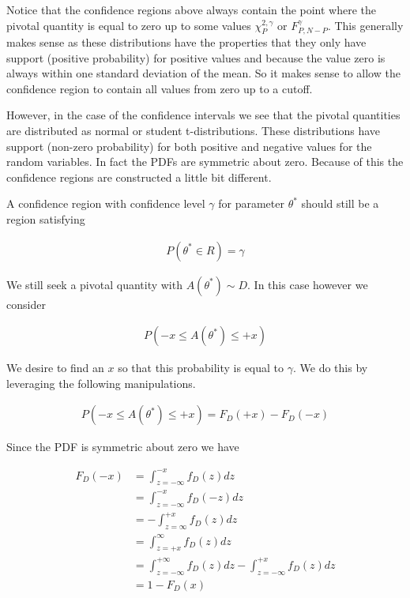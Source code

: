 \documentclass[12pt]{article}
\begin{document}
Notice that the confidence regions above always contain the point where the pivotal quantity is equal to zero up to some values $\chi^{2,\gamma}_P$ or $F_{P,N-P}^{\gamma}$.
This generally makes sense as these distributions have the properties that they only have support (positive probability) for positive values and because the value zero is always within one standard deviation of the mean.
So it makes sense to allow the confidence region to contain all values from zero up to a cutoff.

However, in the case of the confidence intervals we see that the pivotal quantities are distributed as normal or student t-distributions. 
These distributions have support (non-zero probability) for both positive and negative values for the random variables.
In fact the PDFs are symmetric about zero.
Because of this the confidence regions are constructed a little bit different.

A confidence region with confidence level $\gamma$ for parameter $\theta^*$ should still be a region satisfying

\begin{align}
P(\theta^* \in R) = \gamma
\end{align}

We still seek a pivotal quantity with $A(\theta^*) \sim D$.
In this case however we consider

\begin{align}
P(-x \le A(\theta^*) \le + x)
\end{align}

We desire to find an $x$ so that this probability is equal to $\gamma$.
We do this by leveraging the following manipulations.

\begin{align}
P(-x \le A(\theta^*) \le +x) = F_D(+x) - F_D(-x)
\end{align}

Since the PDF is symmetric about zero we have

\begin{align}
F_D(-x) &= \int_{z = -\infty}^{-x} f_D(z)dz\\
&= \int_{z=-\infty}^{-x}f_D(-z) dz\\
&= -\int_{z=\infty}^{+x}f_D(z)dz\\
&= \int_{z=+x}^{\infty} f_D(z)dz\\
&= \int_{z=-\infty}^{+\infty} f_D(z) dz - \int_{z=-\infty}^{+x}f_D(z)dz\\
&= 1 - F_D(x)
\end{align}
\end{document}

